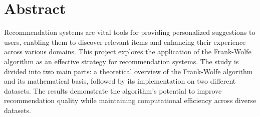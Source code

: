 \documentclass[a4paper, 11pt, reqno]{article} %
\begin{document}


\newpage

\section*{Abstract}
Recommendation systems are vital tools for providing personalized suggestions to users, enabling them to discover relevant items and enhancing their experience across various domains.  This project explores the application of the Frank-Wolfe algorithm as an effective strategy for recommendation systems. The study is divided into two main parts: a theoretical overview of the Frank-Wolfe algorithm and its mathematical basis, followed by its implementation on two different datasets. The results demonstrate the algorithm’s potential to improve recommendation quality while maintaining computational efficiency across diverse datasets.
\vspace{1cm}

\end{document}
